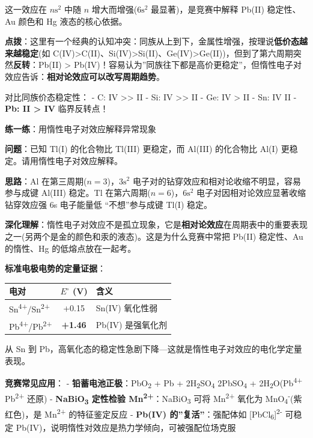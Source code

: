 这一效应在 \(n\mathrm{s}^2\) 中随 \(n\) 增大而增强(\(6\mathrm{s}^2\) 最显著)，是竞赛中解释 Pb(II) 稳定性、Au 颜色和 Hg 液态的核心依据。

\textbf{点拨}：这里有一个经典的认知冲突：同族从上到下，金属性增强，按理说\textbf{低价态越来越稳定}(如 C(IV)\textgreater C(II)、Si(IV)\textgreater Si(II)、Ge(IV)\textgreater Ge(II))，但到了第六周期突然\textbf{反转}：Pb(II) \textgreater{} Pb(IV)！容易认为''同族往下都是高价更稳定''，但惰性电子对效应告诉：\textbf{相对论效应可以改写周期趋势}。

对比同族价态稳定性：
- C: IV \textgreater\textgreater{} II
- Si: IV \textgreater\textgreater{} II
- Ge: IV \textgreater{} II
- Sn: IV  II
- \textbf{Pb: II \textgreater{} IV}  临界反转点！

\textbf{练一练}：用惰性电子对效应解释异常现象

\textbf{问题}：已知 Tl(I) 的化合物比 Tl(III) 更稳定，而 Al(III) 的化合物比 Al(I) 更稳定。请用惰性电子对效应解释。

\textbf{思路}：Al 在第三周期(\(n=3\))，\(3\mathrm{s}^2\) 电子对的钻穿效应和相对论收缩不明显，容易参与成键 \箭 Al(III) 稳定。Tl 在第六周期(\(n=6\))，\(6\mathrm{s}^2\) 电子对因相对论效应显著收缩 \箭 钻穿效应强 \箭 6s 电子能量低 \箭 ``不想''参与成键 \箭 Tl(I) 稳定。

\textbf{深化理解}：惰性电子对效应不是孤立现象，它是\textbf{相对论效应}在周期表中的重要表现之一(另两个是金的颜色和汞的液态)。这是为什么竞赛中常把 Pb(II) 稳定性、Au 的惰性、Hg 的低熔点放在一起考。

\textbf{标准电极电势的定量证据}：

{\def\LTcaptype{none} %
\begin{longtable}[]{@{}lcl@{}}
\toprule\noalign{}
电对 & \(E^\circ\) (V) & 含义 \\
\midrule\noalign{}
\endhead
\bottomrule\noalign{}
\endlastfoot
Sn\textsuperscript{4+}/Sn\textsuperscript{2+} & +0.15 & Sn(IV) 氧化性弱 \\
Pb\textsuperscript{4+}/Pb\textsuperscript{2+} & \textbf{+1.46} & Pb(IV) 是强氧化剂 \\
\end{longtable}
}

从 Sn 到 Pb，高氧化态的稳定性急剧下降---这就是惰性电子对效应的电化学定量表现。

\textbf{竞赛常见应用}：
- \textbf{铅蓄电池正极}：PbO\textsubscript{2} + Pb + 2H\textsubscript{2}SO\textsubscript{4} \箭 2PbSO\textsubscript{4} + 2H\textsubscript{2}O(Pb\textsuperscript{4+} \箭 Pb\textsuperscript{2+} 还原)
- \textbf{NaBiO\textsubscript{3} 定性检验 Mn\textsuperscript{2+}}：NaBiO\textsubscript{3} 可将 Mn\textsuperscript{2+} 氧化为 MnO\textsubscript{4}\textsuperscript{-}(紫红色)，是 Mn\textsuperscript{2+} 的特征鉴定反应
- \textbf{Pb(IV) 的''复活''}：强配体如 {[}PbCl\textsubscript{6}{]}\textsuperscript{2-} 可稳定 Pb(IV)，说明惰性对效应是热力学倾向，可被强配位场克服

